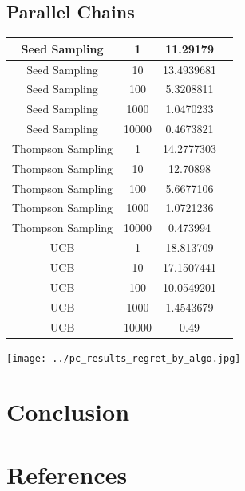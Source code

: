 \documentclass{article}
\begin{document}
\subsection{Parallel Chains}

\begin{table}[]
\begin{tabular}{|c|c|c|c|} 
\hline 
Seed Sampling     & 1       & 11.29179   \\ 
\hline 
Seed Sampling     & 10    & 13.4939681 \\ 
\hline 
Seed Sampling     & 100     & 5.3208811  \\ 
\hline 
Seed Sampling     & 1000   & 1.0470233  \\ 
\hline 
Seed Sampling     & 10000  & 0.4673821  \\ 
\hline 
Thompson Sampling & 1          & 14.2777303 \\ 
\hline 
Thompson Sampling & 10       & 12.70898   \\ 
\hline 
Thompson Sampling & 100    & 5.6677106  \\ 
\hline  
Thompson Sampling & 1000    & 1.0721236  \\ 
\hline 
Thompson Sampling & 10000  & 0.473994   \\ 
\hline 
UCB               & 1         & 18.813709  \\ 
\hline 
UCB               & 10       & 17.1507441 \\ 
\hline 
UCB               & 100      & 10.0549201 \\ 
\hline 
UCB               & 1000    & 1.4543679  \\ 
\hline 
UCB               & 10000  & 0.49      \\ 
\hline 
\end{tabular}
\end{table}
\texttt{[image: ../pc\_results\_regret\_by\_algo.jpg]}
\section{Conclusion}

\section{References}



\end{document}

